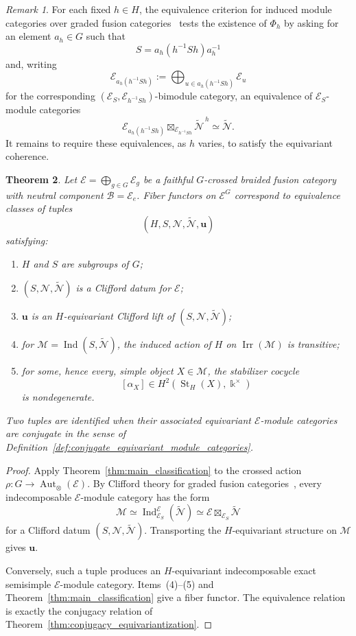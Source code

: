 \documentclass[12pt]{amsart}
\theoremstyle{plain}
\newtheorem{theorem}{Theorem}[section]
\theoremstyle{definition} %
\theoremstyle{remark} %
\newtheorem{remark}[theorem]{Remark}
\newcommand{\ku}{{\Bbbk}} %
\newcommand{\cB}{\mathcal{B}}
\newcommand{\cE}{\mathcal{E}}
\newcommand{\cM}{\mathcal{M}}
\newcommand{\cN}{\mathcal{N}}
\newcommand{\AutT}{\operatorname{Aut}_{\otimes}} %
\newcommand{\Irr}{\operatorname{Irr}}
\DeclareMathOperator{\Ind}{Ind}
\newcommand{\St}{\operatorname{St}}
\begin{document}
\begin{remark}
For each fixed $h\in H$, the equivalence criterion for induced module categories over graded fusion categories~\cite[Definition~5.10 and Proposition~5.12]{MM20} tests the existence of $\Phi_h$ by asking for an element $a_h\in G$ such that
\[
S=a_h(h^{-1}Sh)a_h^{-1}
\]
and, writing
\[
\cE_{a_h(h^{-1}Sh)}:=\bigoplus_{u\in a_h(h^{-1}Sh)}\cE_u
\]
for the corresponding $(\cE_S,\cE_{h^{-1}Sh})$-bimodule category, an
equivalence of $\cE_S$-module categories
\[
\cE_{a_h(h^{-1}Sh)}
\boxtimes_{\cE_{h^{-1}Sh}}
\widetilde{\cN}^{\,h}
\simeq
\widetilde{\cN}.
\]
It remains to require these equivalences, as $h$ varies, to satisfy the equivariant coherence.
\end{remark}

\begin{theorem}\label{thm:gauging_clifford_fiber_functors}
Let $\cE=\bigoplus_{g\in G}\cE_g$ be a faithful $G$-crossed braided fusion category with neutral component $\cB=\cE_e$. Fiber functors on $\cE^G$ correspond to equivalence classes of tuples
\[
(H,S,\cN,\widetilde{\cN},\mathbf{u})
\]
satisfying:
\begin{enumerate}
\item $H$ and $S$ are subgroups of $G$;
\item $(S,\cN,\widetilde{\cN})$ is a Clifford datum for $\cE$;
\item $\mathbf{u}$ is an $H$-equivariant Clifford lift of $(S,\cN,\widetilde{\cN})$;
\item for $\cM=\Ind(S,\widetilde{\cN})$, the induced action of $H$ on $\Irr(\cM)$ is transitive;
\item for some, hence every, simple object $X\in\cM$, the stabilizer cocycle
\[
[\alpha_X]\in H^2(\St_H(X),\ku^\times)
\]
is nondegenerate.
\end{enumerate}

Two tuples are identified when their associated equivariant $\cE$-module categories are conjugate in the sense of Definition~\textup{\ref{def:conjugate_equivariant_module_categories}}.
\end{theorem}

\begin{proof}
Apply Theorem~\ref{thm:main_classification} to the crossed action
$\rho:G\to\AutT(\cE)$. By Clifford theory for graded fusion
categories~\cite{Gal12, MM20}, every indecomposable $\cE$-module category
has the form
\[
\cM\simeq\Ind_{\cE_S}^{\cE}(\widetilde{\cN})
\simeq\cE\boxtimes_{\cE_S}\widetilde{\cN}
\]
for a Clifford datum $(S,\cN,\widetilde{\cN})$. Transporting the
$H$-equivariant structure on $\cM$ gives $\mathbf u$.

Conversely, such a tuple produces an $H$-equivariant indecomposable exact
semisimple $\cE$-module category. Items~\textup{(4)--(5)} and
Theorem~\ref{thm:main_classification} give a fiber functor. The equivalence
relation is exactly the conjugacy relation of
Theorem~\ref{thm:conjugacy_equivariantization}.
\end{proof}
\end{document}
